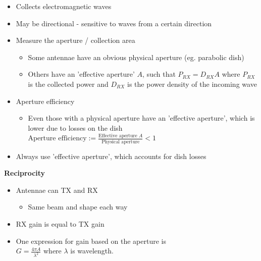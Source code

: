 \documentclass[12pt]{article}
\begin{document}
\begin{itemize}[noitemsep]
    \item Collects electromagnetic waves
    \item May be directional - sensitive to waves from a certain direction
    \item Measure the aperture / collection area
    \begin{itemize}[noitemsep]
        \item Some antennae have an obvious physical aperture (eg. parabolic dish)
        \item Others have an 'effective aperture' $A$, such that
        \begin{math}
        P_{RX} = D_{RX}A
        \end{math}
        where $P_{RX}$ is the collected power and $D_{RX}$ is the power density of the incoming wave
        \end{itemize}
    \item Aperture efficiency
    \begin{itemize}[noitemsep]
        \item Even those with a physical aperture have an 'effective aperture', which is lower due to losses on the dish\\
        \begin{math}
            \text{Aperture efficiency} := \frac{\text{Effective aperture } A}{\text{Physical aperture}} < 1
        \end{math}
    \end{itemize}
    \item Always use 'effective aperture', which accounts for dish losses
\end{itemize}

\textbf{Reciprocity}

\begin{itemize}[noitemsep]
    \item Antennae can TX and RX
    \begin{itemize}[noitemsep]
        \item Same beam and shape each way
    \end{itemize}
    \item RX gain is equal to TX gain
    \item One expression for gain based on the aperture is\\
    \begin{math}
        G = \frac{4\pi A}{\lambda^2}
    \end{math}
    where $\lambda$ is wavelength.
\end{itemize}
\end{document}
